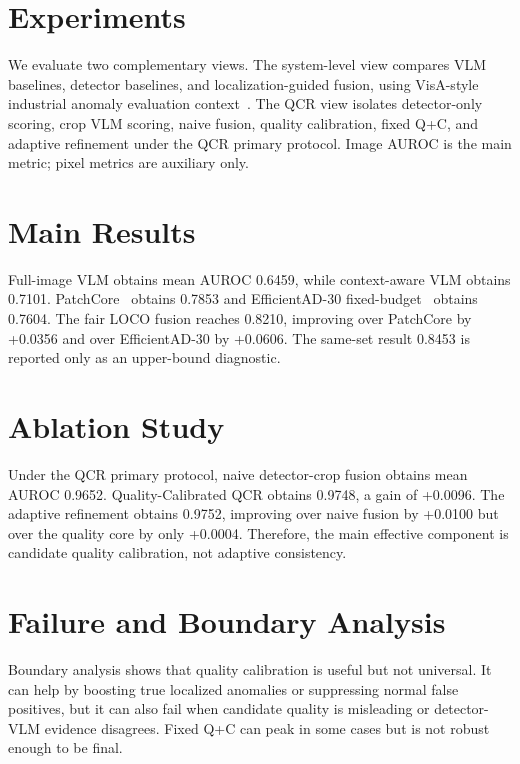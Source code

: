 \documentclass[10pt]{article}
\begin{document}
\section{Experiments}

We evaluate two complementary views.
The system-level view compares VLM baselines, detector baselines, and localization-guided fusion, using VisA-style industrial anomaly evaluation context~\cite{Zou2022VisA}.
The QCR view isolates detector-only scoring, crop VLM scoring, naive fusion, quality calibration, fixed Q+C, and adaptive refinement under the QCR primary protocol.
Image AUROC is the main metric; pixel metrics are auxiliary only.

\section{Main Results}

Full-image VLM obtains mean AUROC 0.6459, while context-aware VLM obtains 0.7101.
PatchCore~\cite{Roth2022PatchCore} obtains 0.7853 and EfficientAD-30 fixed-budget~\cite{Batzner2024EfficientAD} obtains 0.7604.
The fair LOCO fusion reaches 0.8210, improving over PatchCore by +0.0356 and over EfficientAD-30 by +0.0606.
The same-set result 0.8453 is reported only as an upper-bound diagnostic.



\section{Ablation Study}

Under the QCR primary protocol, naive detector-crop fusion obtains mean AUROC 0.9652.
Quality-Calibrated QCR obtains 0.9748, a gain of +0.0096.
The adaptive refinement obtains 0.9752, improving over naive fusion by +0.0100 but over the quality core by only +0.0004.
Therefore, the main effective component is candidate quality calibration, not adaptive consistency.



\section{Failure and Boundary Analysis}

Boundary analysis shows that quality calibration is useful but not universal.
It can help by boosting true localized anomalies or suppressing normal false positives, but it can also fail when candidate quality is misleading or detector-VLM evidence disagrees.
Fixed Q+C can peak in some cases but is not robust enough to be final.
\end{document}
